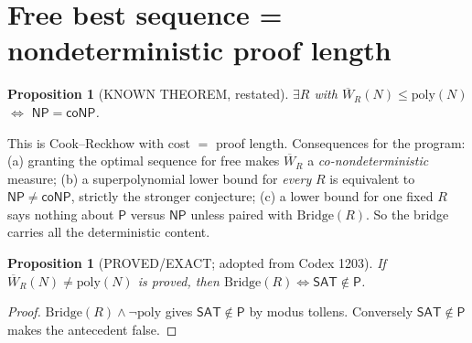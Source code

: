 \documentclass[11pt]{article}
\newtheorem{proposition}[theorem]{Proposition}
\newcommand{\SAT}{\mathsf{SAT}}
\newcommand{\Pc}{\mathsf{P}}
\newcommand{\NP}{\mathsf{NP}}
\newcommand{\coNP}{\mathsf{coNP}}
\newcommand{\Wb}{\overline W}
\begin{document}
\section{Free best sequence = nondeterministic proof length}
\begin{proposition}[KNOWN THEOREM, restated]\label{prop:cr}
$\exists R$ with $\Wb_R(N)\le\mathrm{poly}(N)$ $\iff$ $\NP=\coNP$.
\end{proposition}
This is Cook--Reckhow with cost $=$ proof length. Consequences for the program:
(a) granting the optimal sequence for free makes $\Wb_R$ a
\emph{co-nondeterministic} measure; (b) a superpolynomial lower bound for
\emph{every} $R$ is equivalent to $\NP\ne\coNP$, strictly the stronger
conjecture; (c) a lower bound for one fixed $R$ says nothing about $\Pc$ versus
$\NP$ unless paired with $\mathrm{Bridge}(R)$. So the bridge carries all
the deterministic content.

\begin{proposition}[PROVED/EXACT; adopted from Codex 1203]\label{prop:equiv}
If $\Wb_R(N)\ne\mathrm{poly}(N)$ is proved, then $\mathrm{Bridge}(R)\iff \SAT\notin\Pc$.
\end{proposition}
\begin{proof}
$\mathrm{Bridge}(R)\wedge\neg\mathrm{poly}$ gives $\SAT\notin\Pc$ by modus
tollens. Conversely $\SAT\notin\Pc$ makes the antecedent false.
\end{proof}
\end{document}
